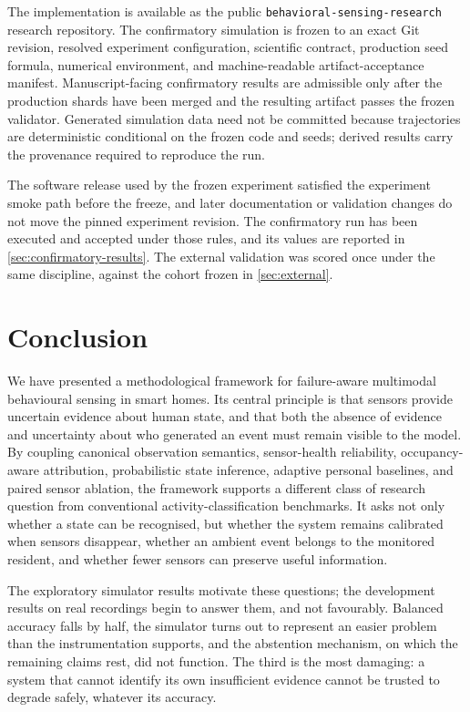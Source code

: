 \documentclass[11pt]{article}
\begin{document}
The implementation is available as the public \texttt{behavioral-sensing-research} research repository. The confirmatory simulation is frozen to an exact Git revision, resolved experiment configuration, scientific contract, production seed formula, numerical environment, and machine-readable artifact-acceptance manifest. Manuscript-facing confirmatory results are admissible only after the production shards have been merged and the resulting artifact passes the frozen validator. Generated simulation data need not be committed because trajectories are deterministic conditional on the frozen code and seeds; derived results carry the provenance required to reproduce the run.

The software release used by the frozen experiment satisfied the experiment smoke path before the freeze, and later documentation or validation changes do not move the pinned experiment revision. The confirmatory run has been executed and accepted under those rules, and its values are reported in \cref{sec:confirmatory-results}. The external validation was scored once under the same discipline, against the cohort frozen in \cref{sec:external}.

\section{Conclusion}

We have presented a methodological framework for failure-aware multimodal behavioural sensing in smart homes. Its central principle is that sensors provide uncertain evidence about human state, and that both the absence of evidence and uncertainty about who generated an event must remain visible to the model. By coupling canonical observation semantics, sensor-health reliability, occupancy-aware attribution, probabilistic state inference, adaptive personal baselines, and paired sensor ablation, the framework supports a different class of research question from conventional activity-classification benchmarks. It asks not only whether a state can be recognised, but whether the system remains calibrated when sensors disappear, whether an ambient event belongs to the monitored resident, and whether fewer sensors can preserve useful information.

The exploratory simulator results motivate these questions; the development
results on real recordings begin to answer them, and not favourably. Balanced
accuracy falls by half, the simulator turns out to represent an easier problem
than the instrumentation supports, and the abstention mechanism, on which the
remaining claims rest, did not function. The third is the most damaging: a system that
cannot identify its own insufficient evidence cannot be trusted to degrade
safely, whatever its accuracy.
\end{document}
